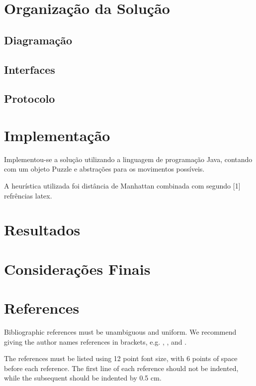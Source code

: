 \documentclass[12pt]{article}
\begin{document}
	\section{Organização da Solução}\label{sec:solucao}


		\subsection{Diagramação}\label{sec:diagramacao}


		\subsection{Interfaces}\label{sec:interfaces}


		\subsection{Protocolo}\label{sec:protocolo}


	\section{Implementação}\label{sec:implementacao}

	Implementou-se a solução utilizando a linguagem de programação Java, contando com um objeto Puzzle e abstrações para os movimentos possíveis.

	A heurística utilizada foi distância de Manhattan combinada com segundo [1] refrências latex.

	\section{Resultados}\label{sec:resultados}	


	\section{Considerações Finais}\label{sec:consideracoesFiinais}

	\section{References}

	Bibliographic references must be unambiguous and uniform.  We recommend giving
	the author names references in brackets, e.g. \cite{knuth:84},
	\cite{boulic:91}, and \cite{smith:99}.

	The references must be listed using 12 point font size, with 6 points of space
	before each reference. The first line of each reference should not be
	indented, while the subsequent should be indented by 0.5 cm.



\end{document}
